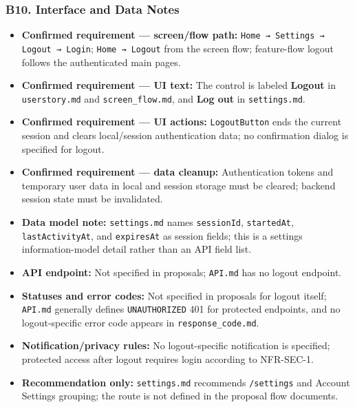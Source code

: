 \documentclass[12pt]{article}
\begin{document}
\hypertarget{sec:b10-interface-and-data-notes}{}
\subsubsection*{B10. Interface and Data Notes}
\par\medskip

\begin{itemize}
\item \textbf{Confirmed requirement --- screen/flow path:} \texttt{Home → Settings → Logout → Login}; \texttt{Home → Logout} from the screen flow; feature-flow logout follows the authenticated main pages.
\item \textbf{Confirmed requirement --- UI text:} The control is labeled \textbf{Logout} in \texttt{userstory.md} and \texttt{screen\_flow.md}, and \textbf{Log out} in \texttt{settings.md}.
\item \textbf{Confirmed requirement --- UI actions:} \texttt{LogoutButton} ends the current session and clears local/session authentication data; no confirmation dialog is specified for logout.
\item \textbf{Confirmed requirement --- data cleanup:} Authentication tokens and temporary user data in local and session storage must be cleared; backend session state must be invalidated.
\item \textbf{Data model note:} \texttt{settings.md} names \texttt{sessionId}, \texttt{startedAt}, \texttt{lastActivityAt}, and \texttt{expiresAt} as session fields; this is a settings information-model detail rather than an API field list.
\item \textbf{API endpoint:} Not specified in proposals; \texttt{API.md} has no logout endpoint.
\item \textbf{Statuses and error codes:} Not specified in proposals for logout itself; \texttt{API.md} generally defines \texttt{UNAUTHORIZED} 401 for protected endpoints, and no logout-specific error code appears in \texttt{response\_code.md}.
\item \textbf{Notification/privacy rules:} No logout-specific notification is specified; protected access after logout requires login according to NFR-SEC-1.
\item \textbf{Recommendation only:} \texttt{settings.md} recommends \texttt{/settings} and Account Settings grouping; the route is not defined in the proposal flow documents.
\end{itemize}
\par\medskip
\end{document}
